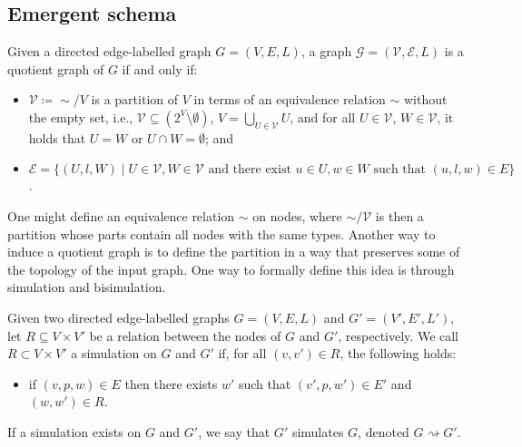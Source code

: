 \subsection{Emergent schema}\label{app:emergent-schema}
\begin{definition}\label{def:quotient-graph}
    Given a directed edge-labelled graph $G = (V, E, L)$, a graph $\mathcal{G} = (\mathcal{V}, \mathcal{E}, L)$ is a quotient graph of $G$ if and only if:
        \begin{itemize}
                \item $\mathcal{V}\coloneqq \sim/V$ is a partition of $V$ in terms of an equivalence relation $\sim$ without the empty set, i.e., $\mathcal{V} \subseteq (2^V \setminus \emptyset)$, $V = \bigcup_{U \in \mathcal{V}} U$, and for all $U \in \mathcal{V}$, $W \in \mathcal{V}$, it holds that $U = W$ or $U \cap W = \emptyset$; and
                \item $\mathcal{E} = \{(U, l, W) \mid U \in \mathcal{V}, W \in \mathcal{V} \text{ and there exist } u \in U, w \in W \text{ such that } (u, l, w) \in E\}$.
        \end{itemize}
\end{definition}

One might define an equivalence relation $\sim$ on nodes, where $\sim/ \mathcal{V}$ is then a partition whose parts contain all nodes with the same types. Another way to induce a quotient graph is to define the partition in a way that preserves some of the topology of the input graph. One way to formally define this idea is through simulation and bisimulation.

\begin{definition}[Simulation]
    Given two directed edge-labelled graphs $G = (V, E, L)$ and $G' = (V', E', L')$, let $R \subseteq V \times V'$ be a relation between the nodes of $G$ and $G'$, respectively. We call $R\subset V\times V'$ a simulation on $G$ and $G'$ if, for all $(v, v') \in R$, the following holds:
    \begin{itemize}
        \item if $(v, p, w) \in E$ then there exists $w'$ such that $(v', p, w') \in E'$ and $(w, w') \in R$.
    \end{itemize}
If a simulation exists on $G$ and $G'$, we say that $G'$ simulates $G$, denoted $G \rightsquigarrow G'$.
\end{definition}

